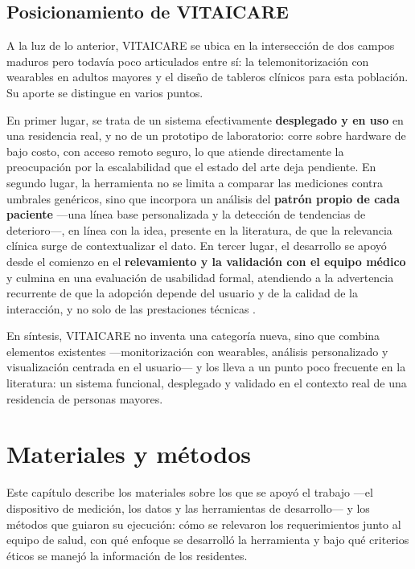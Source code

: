 \documentclass[12pt,a4paper]{article}
\begin{document}
    \subsection{Posicionamiento de VITAICARE}
    A la luz de lo anterior, VITAICARE se ubica en la intersección de dos campos maduros pero todavía poco articulados entre sí: la telemonitorización con wearables en adultos mayores y el diseño de tableros clínicos para esta población. Su aporte se distingue en varios puntos.

    En primer lugar, se trata de un sistema efectivamente \textbf{desplegado y en uso} en una residencia real, y no de un prototipo de laboratorio: corre sobre hardware de bajo costo, con acceso remoto seguro, lo que atiende directamente la preocupación por la escalabilidad que el estado del arte deja pendiente. En segundo lugar, la herramienta no se limita a comparar las mediciones contra umbrales genéricos, sino que incorpora un análisis del \textbf{patrón propio de cada paciente} —una línea base personalizada y la detección de tendencias de deterioro—, en línea con la idea, presente en la literatura, de que la relevancia clínica surge de contextualizar el dato. En tercer lugar, el desarrollo se apoyó desde el comienzo en el \textbf{relevamiento y la validación con el equipo médico} y culmina en una evaluación de usabilidad formal, atendiendo a la advertencia recurrente de que la adopción depende del usuario y de la calidad de la interacción, y no solo de las prestaciones técnicas \cite{moore2021,siette2023}.

    En síntesis, VITAICARE no inventa una categoría nueva, sino que combina elementos existentes —monitorización con wearables, análisis personalizado y visualización centrada en el usuario— y los lleva a un punto poco frecuente en la literatura: un sistema funcional, desplegado y validado en el contexto real de una residencia de personas mayores.
\newpage

\section{Materiales y métodos}

    Este capítulo describe los materiales sobre los que se apoyó el trabajo —el dispositivo de medición, los datos y las herramientas de desarrollo— y los métodos que guiaron su ejecución: cómo se relevaron los requerimientos junto al equipo de salud, con qué enfoque se desarrolló la herramienta y bajo qué criterios éticos se manejó la información de los residentes.
\end{document}
